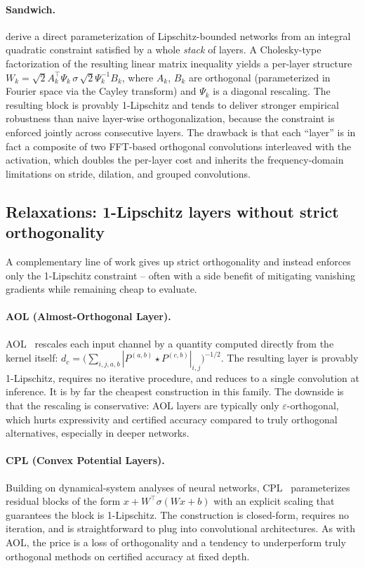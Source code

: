         \paragraph{Sandwich.}
        \cite{wang_direct_2023} derive a direct parameterization of Lipschitz-bounded networks from an integral quadratic constraint satisfied by a whole \emph{stack} of layers. A Cholesky-type factorization of the resulting linear matrix inequality yields a per-layer structure $W_k = \sqrt{2}A_k^\top \Psi_k\,\sigma\,\sqrt{2}\Psi_k^{-1}B_k$, where $A_k$, $B_k$ are orthogonal (parameterized in Fourier space via the Cayley transform) and $\Psi_k$ is a diagonal rescaling. The resulting block is provably 1-Lipschitz and tends to deliver stronger empirical robustness than naive layer-wise orthogonalization, because the constraint is enforced jointly across consecutive layers. The drawback is that each ``layer'' is in fact a composite of two FFT-based orthogonal convolutions interleaved with the activation, which doubles the per-layer cost and inherits the frequency-domain limitations on stride, dilation, and grouped convolutions.

    \subsection{Relaxations: 1-Lipschitz layers without strict orthogonality}

        A complementary line of work gives up strict orthogonality and instead enforces only the 1-Lipschitz constraint -- often with a side benefit of mitigating vanishing gradients while remaining cheap to evaluate.

        \paragraph{AOL (Almost-Orthogonal Layer).}
        AOL~\cite{prach_almost-orthogonal_2022} rescales each input channel by a quantity computed directly from the kernel itself: $d_c = \big(\sum_{i,j,a,b} |P^{(a,b)} \star P^{(c,b)}|_{i,j}\big)^{-1/2}$. The resulting layer is provably 1-Lipschitz, requires no iterative procedure, and reduces to a single convolution at inference. It is by far the cheapest construction in this family. The downside is that the rescaling is conservative: AOL layers are typically only $\varepsilon$-orthogonal, which hurts expressivity and certified accuracy compared to truly orthogonal alternatives, especially in deeper networks.

        \paragraph{CPL (Convex Potential Layers).}
        Building on dynamical-system analyses of neural networks, CPL~\cite{meunier_dynamical_2022} parameterizes residual blocks of the form $x + W^\top \sigma(Wx + b)$ with an explicit scaling that guarantees the block is 1-Lipschitz. The construction is closed-form, requires no iteration, and is straightforward to plug into convolutional architectures. As with AOL, the price is a loss of orthogonality and a tendency to underperform truly orthogonal methods on certified accuracy at fixed depth.

